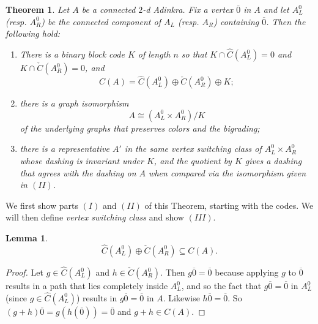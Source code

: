 \documentclass[12pt,twoside,singlespace]{article}
\numberwithin{equation}{section}
\newtheorem{thm}[equation]{Theorem}
\newtheorem{lem}[equation]{Lemma}
\theoremstyle{definition}
\begin{document}
\begin{thm}
\label{thm:quotient}
Let $A$ be a connected $2$-d Adinkra.  Fix a vertex $\overline{0}$ in $A$ and let $A_L^0$ (resp. $A_R^0$) be the connected component of $A_L$ (resp. $A_R$) containing $\overline{0}$. Then the following hold:
\begin{enumerate}
\item[I] There is a binary block code $K$ of length $n$ so that $K\cap \hat{C}(A_L^0)=0$ and $K\cap \check{C}(A_R^0)=0$, and
\[C(A)=\hat{C}(A_L^0)\oplus \check{C}(A_R^0)\oplus K;\]
\item[II] there is a graph isomorphism
\begin{equation}
\label{eqn:quotientiso}
A\cong (A_L^0\times A_R^0)/K
\end{equation}
of the underlying graphs that preserves colors and the bigrading;
\item[III] there is a representative $A'$ in the same vertex switching class of $A_L^0\times A_R^0$ whose dashing is invariant under $K$, and the quotient by $K$ gives a dashing that agrees with the dashing on $A$ when compared via the isomorphism given in $(II)$. 
\end{enumerate}
\end{thm}

We first show parts $(I)$ and $(II)$ of this Theorem, starting with the codes.
We will then define \emph{vertex switching class} and show $(III)$.

\begin{lem}
\label{lem:cplus}
\[\hat{C}(A_L^0)\oplus \check{C}(A_R^0) \subseteq C(A).\]
\end{lem}
\begin{proof}
Let $g\in\hat{C}(A_L^0)$ and $h\in \check{C}(A_R^0)$.  Then $g\overline{0}=\overline{0}$ because applying $g$ to $\overline{0}$ results in a path that lies completely inside $A_L^0$, and so the fact that $g\overline{0}=\overline{0}$ in $A_L^0$ (since $g\in \hat{C}(A_L^0)$) results in $g\overline{0}=\overline{0}$ in $A$.  Likewise $h\overline{0}=\overline{0}$.  So $(g+h)\overline{0}=g(h(\overline{0}))=\overline{0}$ and $g+h\in C(A)$.
\end{proof}
\end{document}
